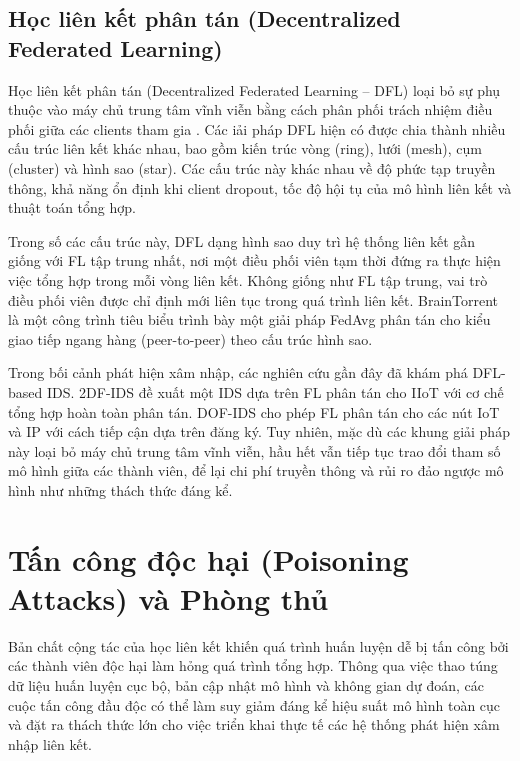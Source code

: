 \subsection{Học liên kết phân tán (Decentralized Federated Learning)}
\label{sec:dfl}
Học liên kết phân tán (Decentralized Federated Learning -- DFL) loại bỏ sự phụ thuộc vào máy chủ trung tâm vĩnh viễn bằng cách phân phối trách nhiệm điều phối giữa các clients tham gia \cite{beltran2023dflsurvey}. Các iải pháp DFL hiện có được chia thành nhiều cấu trúc liên kết khác nhau, bao gồm kiến trúc vòng (ring), lưới (mesh), cụm (cluster) và hình sao (star). Các cấu trúc này khác nhau về độ phức tạp truyền thông, khả năng ổn định khi client dropout, tốc độ hội tụ của mô hình liên kết và thuật toán tổng hợp.

Trong số các cấu trúc này, DFL dạng hình sao duy trì hệ thống liên kết gần giống với FL tập trung nhất, nơi một điều phối viên tạm thời đứng ra thực hiện việc tổng hợp trong mỗi vòng liên kết. Không giống như FL tập trung, vai trò điều phối viên được chỉ định mới liên tục trong quá trình liên kết. BrainTorrent \cite{braintorrent} là một công trình tiêu biểu trình bày một giải pháp FedAvg phân tán cho kiểu giao tiếp ngang hàng (peer-to-peer) theo cấu trúc hình sao.

Trong bối cảnh phát hiện xâm nhập, các nghiên cứu gần đây đã khám phá DFL-based IDS. 2DF-IDS \cite{friha20232dfl-ids} đề xuất một IDS dựa trên FL phân tán cho IIoT với cơ chế tổng hợp hoàn toàn phân tán. DOF-IDS \cite{nakip2023dfl-ids} cho phép FL phân tán cho các nút IoT và IP với cách tiếp cận dựa trên đăng ký. Tuy nhiên, mặc dù các khung giải pháp này loại bỏ máy chủ trung tâm vĩnh viễn, hầu hết vẫn tiếp tục trao đổi tham số mô hình giữa các thành viên, để lại chi phí truyền thông và rủi ro đảo ngược mô hình như những thách thức đáng kể.

\section{Tấn công độc hại (Poisoning Attacks) và Phòng thủ}
\label{sec:poisoning}

Bản chất cộng tác của học liên kết khiến quá trình huấn luyện dễ bị tấn công bởi các thành viên độc hại làm hỏng quá trình tổng hợp. Thông qua việc thao túng dữ liệu huấn luyện cục bộ, bản cập nhật mô hình và không gian dự đoán, các cuộc tấn công đầu độc có thể làm suy giảm đáng kể hiệu suất mô hình toàn cục và đặt ra thách thức lớn cho việc triển khai thực tế các hệ thống phát hiện xâm nhập liên kết.

